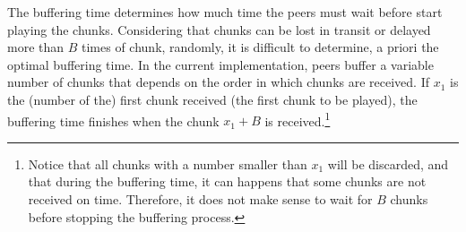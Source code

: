 \begin{comment}
\begin{figure*}
  \fig{500}{5cm}{DBS_peer_buffering} \caption{Buffering of the
    chunks.\label{fig:DBS_peer_buffering}}
\end{figure*}
\end{comment}

The buffering time determines how much time the peers must wait before
start playing the chunks. Considering that chunks can be lost in
transit or delayed more than $B$ times of chunk, randomly, it is
difficult to determine, a priori the optimal buffering time. In the
current implementation, peers buffer a variable number of chunks that
depends on the order in which chunks are received. If $x_1$ is the
(number of the) first chunk received (the first chunk to be played),
the buffering time finishes when the chunk $x_1+B$ is
received.\footnote{Notice that all chunks with a number smaller than
  $x_1$ will be discarded, and that during the buffering time, it can
  happens that some chunks are not received on time. Therefore, it
  does not make sense to wait for $B$ chunks before stopping the
  buffering process.}


\begin{comment}
An heuristic that
works is the described in the Fig.~\ref{fig:DBS_peer_buffering}. As
can be seen, $\text{chunk\_to\_play}$ points to the first received
chunk, that not necessary is the received chunk with lower
index. After that, the
buffering finishes when a chunk with index $\text{chunk\_to\_play} +
\text{BUFFER\_SIZE}/2$ has been received.\footnote{This not means that
  $\text{BUFFER\_SIZE}/2$ chunks are available in the buffer.}
\end{comment}
